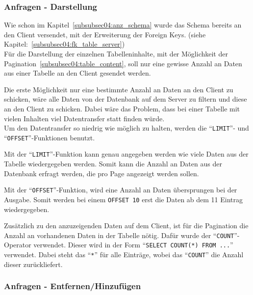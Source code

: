 


  

\subsubsection{Anfragen - Darstellung}
\label{subsubsec04:anfragen_darstellung}

Wie schon im Kapitel~\ref{subsubsec04:anz_schema} wurde das Schema bereits an den Client versendet, mit der Erweiterung der Foreign Keys. (siehe Kapitel:~\ref{subsubsec04:fk_table_server}) \\
Für die Darstellung der einzelnen Tabelleninhalte, mit der Möglichkeit der Pagination~\ref{subsubsec04:table_content}, soll nur eine gewisse Anzahl an Daten aus einer Tabelle an den Client gesendet werden.

Die erste Möglichkeit nur eine bestimmte Anzahl an Daten an den Client zu schicken, wäre alle Daten von der Datenbank auf dem Server zu filtern und diese an den Client zu schicken. Dabei wäre das Problem, dass bei einer Tabelle mit vielen Inhalten viel Datentransfer statt finden würde. \\
Um den Datentransfer so niedrig wie möglich zu halten, werden die ``\texttt{LIMIT}''- und ``\texttt{OFFSET}''-Funktionen benutzt. 

Mit der ``\texttt{LIMIT}''-Funktion kann genau angegeben werden wie viele Daten aus der Tabelle wiedergegeben werden. Somit kann die Anzahl an Daten aus der Datenbank erfragt werden, die pro Page angezeigt werden sollen.

Mit der ``\texttt{OFFSET}''-Funktion, wird eine Anzahl an Daten übersprungen bei der Ausgabe. Somit werden bei einem \texttt{OFFSET 10} erst die Daten ab dem 11 Eintrag wiedergegeben. 

Zusätzlich zu den anzuzeigenden Daten auf dem Client, ist für die Pagination die Anzahl an vorhandenen Daten in der Tabelle nötig. Dafür wurde der ``\texttt{COUNT}''-Operator verwendet. Dieser wird in der Form ``\texttt{SELECT COUNT(*) FROM ...}'' verwendet. Dabei steht das ``\texttt{*}'' für alle Einträge, wobei das ``\texttt{COUNT}'' die Anzahl dieser zurückliefert.  

\subsubsection{Anfragen - Entfernen/Hinzufügen}
\label{subsubsec04:anfragen_editor_add_remove}

